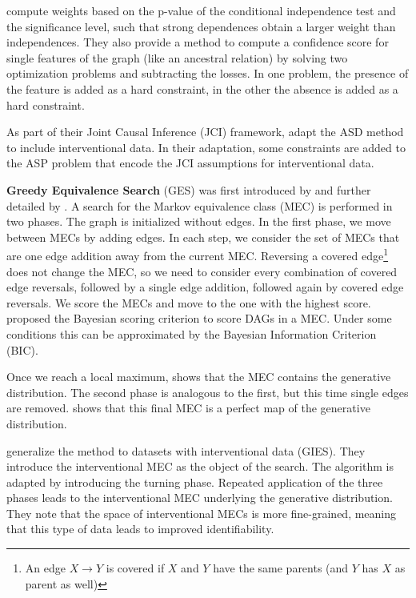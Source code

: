 \citet{magliacane2016ancestral} compute weights based on the p-value of the conditional independence test and the significance level, such that strong dependences obtain a larger weight than independences. They also provide a method to compute a confidence score for single features of the graph (like an ancestral relation) by solving two optimization problems and subtracting the losses. In one problem, the presence of the feature is added as a hard constraint, in the other the absence is added as a hard constraint. 

As part of their Joint Causal Inference (JCI) framework, \citet{mooij2016joint} adapt the ASD method to include interventional data. In their adaptation, some constraints are added to the ASP problem that encode the JCI assumptions for interventional data.

\textbf{Greedy Equivalence Search} (GES) was first introduced by \citet{meek1997graphical} and further detailed by \citet{chickering2002optimal}. A search for the Markov equivalence class (MEC) is performed in two phases. The graph is initialized without edges. In the first phase, we move between MECs by adding edges. In each step, we consider the set of MECs that are one edge addition away from the current MEC. Reversing a covered edge\footnote{An edge $X\to Y$ is covered if $X$ and $Y$ have the same parents (and $Y$ has $X$ as parent as well)} does not change the MEC, so we need to consider every combination of covered edge reversals, followed by a single edge addition, followed again by covered edge reversals. We score the MECs and move to the one with the highest score. \citet{meek1997graphical} proposed the Bayesian scoring criterion to score DAGs in a MEC. Under some conditions this can be approximated by the Bayesian Information Criterion (BIC). 

Once we reach a local maximum, \citet{chickering2002optimal} shows that the MEC contains the generative distribution. The second phase is analogous to the first, but this time single edges are removed. \citet{chickering2002optimal} shows that this final MEC is a perfect map of the generative distribution.

\citet{hauser2012characterization} generalize the method to datasets with interventional data (GIES). They introduce the interventional MEC as the object of the search. The algorithm is adapted by introducing the turning phase. Repeated application of the three phases leads to the interventional MEC underlying the generative distribution. They note that the space of interventional MECs is more fine-grained, meaning that this type of data leads to improved identifiability.



